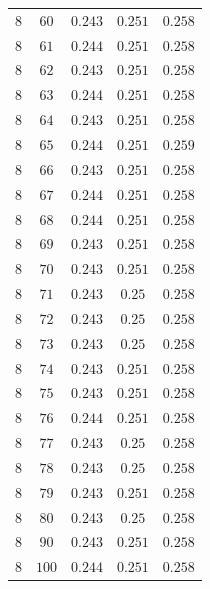 \begin{table}[H]
\begin{tabular}{ccccc}
$8$ & $60$ & $0.243$ & $0.251$ & $0.258$\\
$8$ & $61$ & $0.244$ & $0.251$ & $0.258$\\
$8$ & $62$ & $0.243$ & $0.251$ & $0.258$\\
$8$ & $63$ & $0.244$ & $0.251$ & $0.258$\\
$8$ & $64$ & $0.243$ & $0.251$ & $0.258$\\
$8$ & $65$ & $0.244$ & $0.251$ & $0.259$\\
$8$ & $66$ & $0.243$ & $0.251$ & $0.258$\\
$8$ & $67$ & $0.244$ & $0.251$ & $0.258$\\
$8$ & $68$ & $0.244$ & $0.251$ & $0.258$\\
$8$ & $69$ & $0.243$ & $0.251$ & $0.258$\\
$8$ & $70$ & $0.243$ & $0.251$ & $0.258$\\
$8$ & $71$ & $0.243$ & $0.25$ & $0.258$\\
$8$ & $72$ & $0.243$ & $0.25$ & $0.258$\\
$8$ & $73$ & $0.243$ & $0.25$ & $0.258$\\
$8$ & $74$ & $0.243$ & $0.251$ & $0.258$\\
$8$ & $75$ & $0.243$ & $0.251$ & $0.258$\\
$8$ & $76$ & $0.244$ & $0.251$ & $0.258$\\
$8$ & $77$ & $0.243$ & $0.25$ & $0.258$\\
$8$ & $78$ & $0.243$ & $0.25$ & $0.258$\\
$8$ & $79$ & $0.243$ & $0.251$ & $0.258$\\
$8$ & $80$ & $0.243$ & $0.25$ & $0.258$\\
$8$ & $90$ & $0.243$ & $0.251$ & $0.258$\\
$8$ & $100$ & $0.244$ & $0.251$ & $0.258$\\
\end{tabular}
\end{table}
 